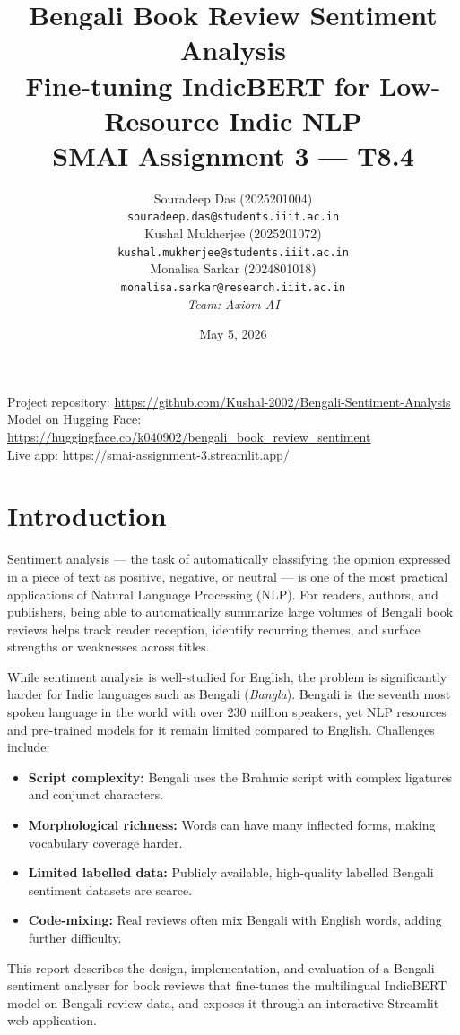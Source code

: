 \documentclass[11pt,a4paper]{article}
\title{
    \textbf{Bengali Book Review Sentiment Analysis} \\[0.5em]
    \large Fine-tuning IndicBERT for Low-Resource Indic NLP \\[0.3em]
    \normalsize SMAI Assignment 3 --- T8.4
}
\author{Souradeep Das (2025201004) \\
\texttt{souradeep.das@students.iiit.ac.in} \\
Kushal Mukherjee (2025201072) \\
\texttt{kushal.mukherjee@students.iiit.ac.in} \\
Monalisa Sarkar (2024801018) \\
\texttt{monalisa.sarkar@research.iiit.ac.in} \\
\textit{Team: Axiom AI}}
\date{May 5, 2026}
\begin{document}
\maketitle
\thispagestyle{fancy}

\noindent Project repository: \url{https://github.com/Kushal-2002/Bengali-Sentiment-Analysis} \\
Model on Hugging Face: \url{https://huggingface.co/k040902/bengali_book_review_sentiment} \\
Live app: \url{https://smai-assignment-3.streamlit.app/}

\section{Introduction}

Sentiment analysis — the task of automatically classifying the opinion expressed in a piece of text as positive, negative, or neutral — is one of the most practical applications of Natural Language Processing (NLP). For readers, authors, and publishers, being able to automatically summarize large volumes of Bengali book reviews helps track reader reception, identify recurring themes, and surface strengths or weaknesses across titles.

While sentiment analysis is well-studied for English, the problem is significantly harder for Indic languages such as Bengali (\textit{Bangla}). Bengali is the seventh most spoken language in the world with over 230 million speakers, yet NLP resources and pre-trained models for it remain limited compared to English. Challenges include:
\begin{itemize}[noitemsep]
    \item \textbf{Script complexity:} Bengali uses the Brahmic script with complex ligatures and conjunct characters.
    \item \textbf{Morphological richness:} Words can have many inflected forms, making vocabulary coverage harder.
    \item \textbf{Limited labelled data:} Publicly available, high-quality labelled Bengali sentiment datasets are scarce.
    \item \textbf{Code-mixing:} Real reviews often mix Bengali with English words, adding further difficulty.
\end{itemize}

This report describes the design, implementation, and evaluation of a Bengali sentiment analyser for book reviews that fine-tunes the multilingual IndicBERT model on Bengali review data, and exposes it through an interactive Streamlit web application.
\end{document}

